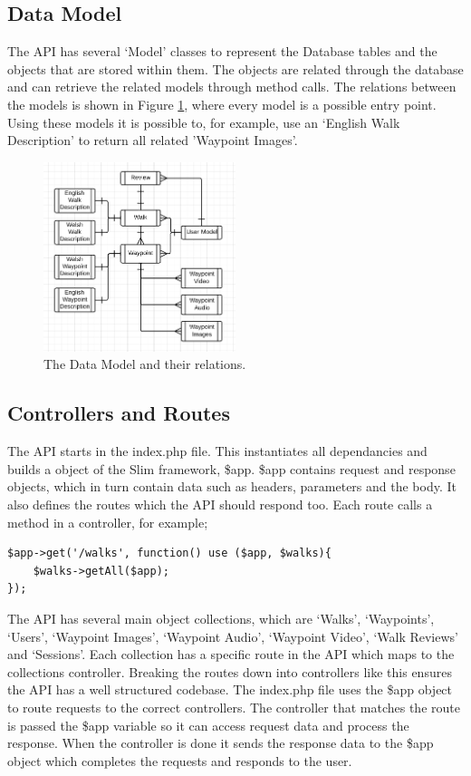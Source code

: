 \documentclass[11pt,a4paper]{report}
\begin{document}
\subsection{Data Model}
\label{sec:api:class}
The API has several `Model' classes to represent the Database tables and the objects that are stored within them. The objects are related through the database and can retrieve the related models through method calls. The relations between the models is shown in Figure \ref{fig:datamodels}, where every model is a possible entry point. Using these models it is possible to, for example, use an `English Walk Description' to return all related 'Waypoint Images'. 

\begin{figure}[H]
    \centering
    \includegraphics[width=0.5\textwidth]{DataModels}
    \caption{The Data Model and their relations.}
    \label{fig:datamodels}
\end{figure}


\subsection{Controllers and Routes}
The API starts in the index.php file. This instantiates all dependancies and builds a object of the Slim framework, \$app. \$app contains request and response objects, which in turn contain data such as headers, parameters and the body. It also defines the routes which the API should respond too. Each route calls a method in a controller, for example;

\begin{lstlisting}[captionpos=b, caption=A basic route for /walks, label=lst:walks, frame=single]
$app->get('/walks', function() use ($app, $walks){
 	$walks->getAll($app);
});
\end{lstlisting}

The API has several main object collections, which are `Walks', `Waypoints', `Users', `Waypoint Images', `Waypoint Audio', `Waypoint Video', `Walk Reviews' and `Sessions'. Each collection has a specific route in the API which maps to the collections controller. Breaking the routes down into controllers like this ensures the API has a well structured codebase. The index.php file uses the \$app object to route requests to the correct controllers. The controller that matches the route is passed the \$app variable so it can access request data and process the response. When the controller is done it sends the response data to the \$app object which completes the requests and responds to the user. 
\end{document}
